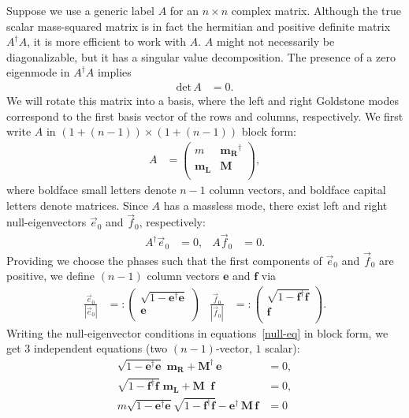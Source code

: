 \documentclass[a4paper,12pt]{article}
\begin{document}
Suppose we use a generic label $A$ for an $n\times n$ complex matrix. Although the true scalar mass-squared matrix is in fact the hermitian and positive definite matrix $A^\dagger A$, it is more efficient to work with $A$. $A$ might not necessarily be diagonalizable,
but it has a singular value decomposition. The presence of a zero eigenmode in $A^\dagger A$ implies
\begin{align}
\mathrm{det}\,A&=0.
\end{align}
We will rotate this matrix into a basis, where the left and right Goldstone modes correspond to the first basis vector of the rows and columns, respectively. We first write $A$ in  \hbox{$(1+(n-1))\times (1+(n-1))$} block form:
\begin{align}
A&=\begin{pmatrix} m&\mathbf{m_R}^\dagger\\ \mathbf{m_L}&\mathbf{M}\\\end{pmatrix},
\end{align}
where boldface small letters denote $n-1$ column vectors, and boldface capital letters denote matrices. Since $A$ has a massless mode, there exist left and right null-eigenvectors $\vec{e}_0$ and $\vec{f}_0$, respectively:
\begin{align}
A^\dagger\vec{e}_0&=0,&A\vec{f}_0&=0.\label{null-eq}
\end{align}
Providing we choose the phases such that the first components of $\vec{e}_0$ and $\vec{f}_0$ are positive, we
define $(n-1)$ column vectors $\mathbf{e}$ and $\mathbf{f}$ via
\begin{align}
\frac{\vec{e}_0}{|\vec{e}_0|}&=:\begin{pmatrix} \sqrt{1-\mathbf{e}^\dagger\mathbf{e}}\\\mathbf{e}\\\end{pmatrix}&
\frac{\vec{f}_0}{|\vec{f}_0|}&=:\begin{pmatrix} \sqrt{1-\mathbf{f}^\dagger\mathbf{f}}\\\mathbf{f}\\\end{pmatrix}.
\end{align}
Writing the null-eigenvector conditions in equations~\eqref{null-eq} in block form, we get $3$ independent equations (two $(n-1)$-vector, $1$ scalar):
\begin{align}
\sqrt{1-\mathbf{e}^\dagger\mathbf{e}}\;\mathbf{m_R}+\mathbf{M}^\dagger\,\mathbf{e}&=0,\\
\sqrt{1-\mathbf{f}^\dagger\mathbf{f}}\;\mathbf{m_L}+\mathbf{M}^{\phantom{\dagger}}\,\mathbf{f}&=0,\\
m\sqrt{1-\mathbf{e}^\dagger\mathbf{e}}\sqrt{1-\mathbf{f}^\dagger\mathbf{f}}-\mathbf{e}^\dagger\,\mathbf{M}\,\mathbf{f}&=0
\end{align}
\end{document}
